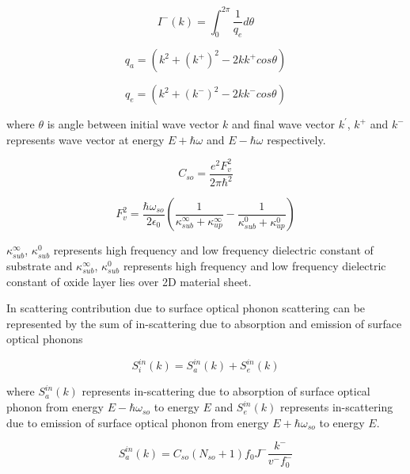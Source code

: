 \documentclass[12pt]{article}
\begin{document}
\begin{equation}
I^{-}(k) = \int_0^{2\pi} \frac{1}{q_{e}} d\theta 
\label{J_minus_so}
\end{equation}



\begin{equation}
q_{a} = \left( k^2 + \left( k^{+}\right)^2 - 2k k^{+} cos \theta \right)
\label{q_ab_so}
\end{equation}

\begin{equation}
q_{e} = \left( k^2 + \left( k^{-}\right)^2 - 2k k^{-} cos \theta \right)
\label{q_em_so}
\end{equation}

where $\theta $ is angle between initial wave vector $k$ and final wave vector $k^{'}$, $k^+$ and $k^-$ represents wave vector at energy $E+ \hbar \omega$ and $E- \hbar \omega$ respectively.

\begin{equation}
C_{so} = \frac{e^2 F_{v}^2}{2 \pi \hbar^2}  
\label{so_const}
\end{equation}

\begin{equation}
F_v^2 = \frac{\hbar \omega_{so}}{2 \epsilon_0 } \left( \frac{1}{\kappa_{sub}^{\infty} + \kappa_{up}^{\infty}} - \frac{1}{\kappa_{sub}^{0} + \kappa_{up}^{0}} \right)
\label{so_const}
\end{equation}

$\kappa_{sub}^{\infty}$, $\kappa_{sub}^{0}$ represents high frequency and low frequency dielectric constant of substrate and $\kappa_{sub}^{\infty}$, $\kappa_{sub}^{0}$ represents high frequency and low frequency dielectric constant of oxide layer lies over 2D material sheet.
 
In scattering contribution due to surface optical phonon scattering can be represented by the sum of in-scattering due to absorption and emission of surface optical phonons 

\begin{equation}
S_i^{in}(k) = S_a^{in}(k) + S_e^{in}(k)
\label{in_sc_so}
\end{equation}

where $S_a^{in}(k)$ represents in-scattering due to absorption of surface optical phonon from energy $E-\hbar \omega_{so}$ to energy $E$ and $S_e^{in}(k)$ represents in-scattering due to emission of surface optical phonon from energy $E+\hbar \omega_{so}$ to energy $E$.
   
\begin{equation}
S_{a}^{in}(k) = C_{so} (N_{so}+1) f_{0}  J^- \frac{k^-}{v ^-f_{0}^-}
\label{ab_in_sc_so}
\end{equation}
\end{document}
